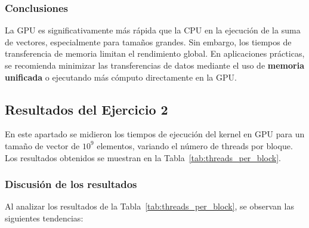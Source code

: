 \documentclass[twocolumn,a4paper,12pt]{article}
\begin{document}
\subsubsection{Conclusiones}
La GPU es significativamente más rápida que la CPU en la ejecución de la suma de vectores, especialmente para tamaños grandes. Sin embargo, los tiempos de transferencia de memoria limitan el rendimiento global. En aplicaciones prácticas, se recomienda minimizar las transferencias de datos mediante el uso de \textbf{memoria unificada} o ejecutando más cómputo directamente en la GPU.

\subsection{Resultados del Ejercicio 2}

En este apartado se midieron los tiempos de ejecución del kernel en GPU para un tamaño de vector de $10^9$ elementos, variando el número de threads por bloque. Los resultados obtenidos se muestran en la Tabla~\ref{tab:threads_per_block}.

\begin{table}[H]
    \centering
    \caption{Tiempos GPU para diferentes valores de threads por bloque}
    \label{tab:threads_per_block}
\end{table}

\subsubsection{Discusión de los resultados}

Al analizar los resultados de la Tabla~\ref{tab:threads_per_block}, se observan las siguientes tendencias:
\end{document}
